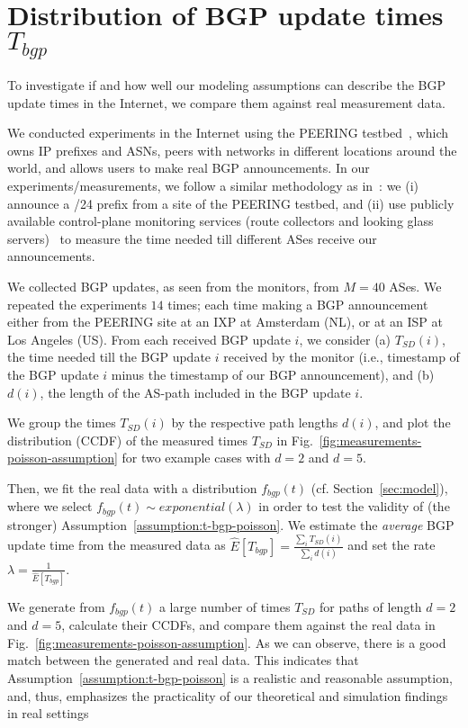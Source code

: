 \section{Distribution of BGP update times $T_{bgp}$}\label{sec:distr-t-bgp}
To investigate if and how well our modeling assumptions can describe the BGP update times in the Internet, we compare them against real measurement data. 

We conducted experiments in the Internet using the PEERING testbed~\cite{Schlinker-PEERING-HotNets-2014}, which owns IP prefixes and ASNs, peers with networks in different locations around the world, and allows users to make real BGP announcements. In our experiments/measurements, we follow a similar methodology as in~\cite{ARTEMIS-Demo-Sigcomm-2016}: we (i) announce a /24 prefix from a site of the PEERING testbed, and (ii) use publicly available control-plane monitoring services (route collectors and looking glass servers)~\cite{bgpmon, ripe-ris,periscope} to measure the time needed till different ASes receive our announcements.

We collected BGP updates, as seen from the monitors, from $M=40$ ASes. We repeated the experiments $14$ times; each time making a BGP announcement either from the PEERING site at an IXP at Amsterdam (NL), or at an ISP at Los Angeles (US). From each received BGP update $i$, we consider (a) $T_{SD}(i)$, the time needed till the BGP update $i$ received by the monitor (i.e., timestamp of the BGP update $i$ minus the timestamp of our BGP announcement), and (b) $d(i)$, the length of the AS-path included in the BGP update $i$. 

We group the times $T_{SD}(i)$ by the respective path lengths $d(i)$, and plot the distribution (CCDF) of the measured times $T_{SD}$ in Fig.~\ref{fig:measurements-poisson-assumption} for two example cases with $d=2$ and $d=5$.

Then, we fit the real data with a distribution $f_{bgp}(t)$ (cf. Section~\ref{sec:model}), where we select $f_{bgp}(t)\sim exponential(\lambda)$ in order to test the validity of (the stronger) Assumption~\ref{assumption:t-bgp-poisson}. We estimate the \textit{average} BGP update time from the measured data as $\hat{E}[T_{bgp}] = \frac{\sum_{i}T_{SD}(i)}{\sum_{i} d(i)}$ and set the rate $\lambda = \frac{1}{\hat{E}[T_{bgp}]}$. 

We generate from $f_{bgp}(t)$ a large number of times $T_{SD}$ for paths of length $d=2$ and $d=5$, calculate their CCDFs, and compare them against the real data in Fig.~\ref{fig:measurements-poisson-assumption}. As we can observe, there is a good match between the generated and real data. This indicates that Assumption~\ref{assumption:t-bgp-poisson} is a realistic and reasonable assumption, and, thus, emphasizes the practicality of our theoretical and simulation findings in real settings

